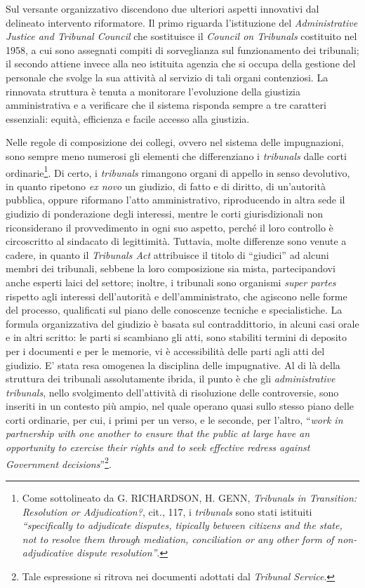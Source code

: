 \documentclass[12pt,it,a4paper,]{report}
\begin{document}
Sul versante organizzativo discendono due ulteriori aspetti innovativi
dal delineato intervento riformatore. Il primo riguarda l'istituzione
del \emph{Administrative Justice and Tribunal Council} che sostituisce
il \emph{Council on Tribunals} costituito nel 1958, a cui sono assegnati
compiti di sorveglianza sul funzionamento dei tribunali; il secondo
attiene invece alla neo istituita agenzia che si occupa della gestione
del personale che svolge la sua attività al servizio di tali organi
contenziosi. La rinnovata struttura è tenuta a monitorare l'evoluzione
della giustizia amministrativa e a verificare che il sistema risponda
sempre a tre caratteri essenziali: equità, efficienza e facile accesso
alla giustizia.

Nelle regole di composizione dei collegi, ovvero nel sistema delle
impugnazioni, sono sempre meno numerosi gli elementi che differenziano i
\emph{tribunals} dalle corti ordinarie\footnote{Come sottolineato da G.
  RICHARDSON, H. GENN, \emph{Tribunals in Transition: Resolution or
  Adjudication?}, cit., 117, i \emph{tribunals} sono stati istituiti
  \emph{``specifically to adjudicate disputes, tipically between
  citizens and the state, not to resolve them through mediation,
  conciliation or any other form of non-adjudicative dispute
  resolution''}.}. Di certo, i \emph{tribunals} rimangono organi di
appello in senso devolutivo, in quanto ripetono \emph{ex novo} un
giudizio, di fatto e di diritto, di un'autorità pubblica, oppure
riformano l'atto amministrativo, riproducendo in altra sede il giudizio
di ponderazione degli interessi, mentre le corti giurisdizionali non
riconsiderano il provvedimento in ogni suo aspetto, perché il loro
controllo è circoscritto al sindacato di legittimità. Tuttavia, molte
differenze sono venute a cadere, in quanto il \emph{Tribunals Act}
attribuisce il titolo di ``giudici'' ad alcuni membri dei tribunali,
sebbene la loro composizione sia mista, partecipandovi anche esperti
laici del settore; inoltre, i tribunali sono organismi \emph{super
partes} rispetto agli interessi dell'autorità e dell'amministrato, che
agiscono nelle forme del processo, qualificati sul piano delle
conoscenze tecniche e specialistiche. La formula organizzativa del
giudizio è basata sul contraddittorio, in alcuni casi orale e in altri
scritto: le parti si scambiano gli atti, sono stabiliti termini di
deposito per i documenti e per le memorie, vi è accessibilità delle
parti agli atti del giudizio. E' stata resa omogenea la disciplina delle
impugnative. Al di là della struttura dei tribunali assolutamente
ibrida, il punto è che gli \emph{administrative tribunals}, nello
svolgimento dell'attività di risoluzione delle controversie, sono
inseriti in un contesto più ampio, nel quale operano quasi sullo stesso
piano delle corti ordinarie, per cui, i primi per un verso, e le
seconde, per l'altro, ``\emph{work in partnership with one another to
ensure that the public at large have an opportunity to exercise their
rights and to seek effective redress against Government
decisions}''\footnote{Tale espressione si ritrova nei documenti adottati
  dal \emph{Tribunal Service}.}.
\end{document}
